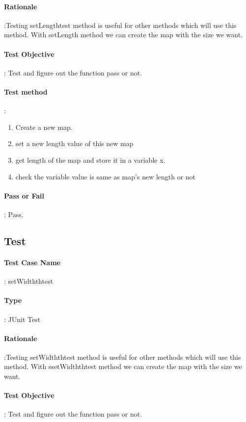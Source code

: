 \documentclass[12pt, a4paper]{report}
\begin{document}
\paragraph{Rationale}:Testing setLengthtest method is useful for other methods which will use this method. With setLength method we can create the map with the size we want.
\paragraph{Test Objective}: Test and figure out the function pass or not.
\paragraph{Test method}: 
\begin{enumerate}
	\item Create a new map.
	\item set a new length value of this new map
	\item get length of the map and store it in a variable x.
	\item check the variable value is same as map's new length or not
\end{enumerate}
\paragraph{Pass or Fail}: Pass.

\addtocounter{casecounter}{1}
\subsection{Test }
\paragraph{Test Case Name}: setWidththtest
\paragraph{Type}: JUnit Test
\paragraph{Rationale}:Testing setWidththtest method is useful for other methods which will use this method. With ssetWidththtest method we can create the map with the size we want.
\paragraph{Test Objective}: Test and figure out the function pass or not.
\end{document}
